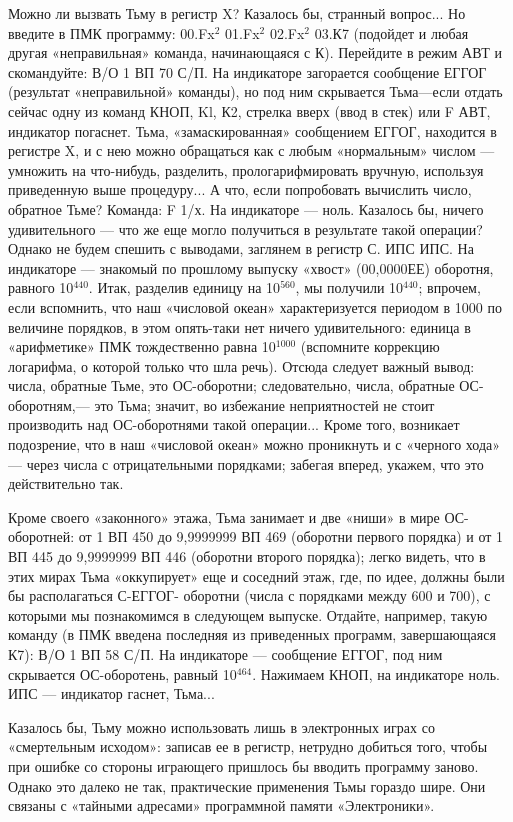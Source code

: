 \documentclass[11pt,a4paper,oneside]{article}
\begin{document}
Можно ли вызвать Тьму в регистр X? Казалось бы, странный вопрос... Но введите в ПМК программу: 00.Fx$^{2}$ 01.Fx$^{2}$ 02.Fx$^{2}$ 03.К7 (подойдет и любая другая «неправильная» команда, начинающаяся с К). Перейдите в режим АВТ и скомандуйте: В/О 1 ВП 70 С/П. На индикаторе загорается сообщение ЕГГОГ (результат «неправильной» команды), но под ним скрывается Тьма—если отдать сейчас одну из команд КНОП, Kl, К2, стрелка вверх (ввод в стек) или F АВТ, индикатор погаснет. Тьма, «замаскированная» сообщением ЕГГОГ, находится в регистре X, и с нею можно обращаться как с любым «нормальным» числом — умножить на что-нибудь, разделить, прологарифмировать вручную, используя приведенную выше процедуру... А что, если попробовать вычислить число, обратное Тьме? Команда: F 1/х. На индикаторе — ноль. Казалось бы, ничего удивительного — что же еще могло получиться в результате такой операции? Однако не будем спешить с выводами, заглянем в регистр С. ИПС ИПС. На индикаторе — знакомый по прошлому выпуску «хвост» (00,0000ЕЕ) оборотня, равного 10$^{440}$. Итак, разделив единицу на 10$^{560}$, мы получили 10$^{440}$; впрочем, если вспомнить, что наш «числовой океан» характеризуется периодом в 1000 по величине порядков, в этом опять-таки нет ничего удивительного: единица в «арифметике» ПМК тождественно равна 10$^{1000}$ (вспомните коррекцию логарифма, о которой только что шла речь). Отсюда следует важный вывод: числа, обратные Тьме, это ОС-оборотни; следовательно, числа, обратные ОС-оборотням,— это Тьма; значит, во избежание неприятностей не стоит производить над ОС-оборотнями такой операции... Кроме того, возникает подозрение, что в наш «числовой океан» можно проникнуть и с «черного хода» — через числа с отрицательными порядками; забегая вперед, укажем, что это действительно так.

Кроме своего «законного» этажа, Тьма занимает и две «ниши» в мире ОС-оборотней: от 1 ВП 450 до 9,9999999 ВП 469 (оборотни первого порядка) и от 1 ВП 445 до 9,9999999 ВП 446 (оборотни второго порядка); легко видеть, что в этих мирах Тьма «оккупирует» еще и соседний этаж, где, по идее, должны были бы располагаться С-ЕГГОГ- оборотни (числа с порядками между 600 и 700), с которыми мы познакомимся в следующем выпуске. Отдайте, например, такую команду (в ПМК введена последняя из приведенных программ, завершающаяся К7): В/О 1 ВП 58 С/П. На индикаторе — сообщение ЕГГОГ, под ним скрывается ОС-оборотень, равный 10$^{464}$. Нажимаем КНОП, на индикаторе ноль. ИПС — индикатор гаснет, Тьма...

Казалось бы, Тьму можно использовать лишь в электронных играх со «смертельным исходом»: записав ее в регистр, нетрудно добиться того, чтобы при ошибке со стороны играющего пришлось бы вводить программу заново. Однако это далеко не так, практические применения Тьмы гораздо шире. Они связаны с «тайными адресами» программной памяти «Электроники».
\end{document}
